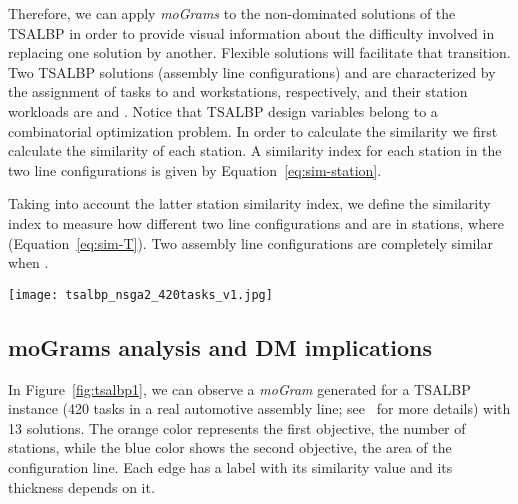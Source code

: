 \documentclass[journal]{IEEEtran}
\begin{document}
Therefore, we can apply \emph{moGrams} to the non-dominated solutions of the TSALBP in order to provide visual information about the difficulty involved in replacing one solution by another. Flexible solutions will facilitate that transition. Two TSALBP solutions (assembly line configurations)  and  are characterized by the assignment of  tasks to  and  workstations, respectively, and their station workloads are  and . Notice that TSALBP design variables belong to a combinatorial optimization problem.
In order to calculate the similarity we first calculate the similarity of each station. A similarity index for each station  in the two line configurations is given by Equation~\ref{eq:sim-station}.



Taking into account the latter station similarity index, we define the similarity index  to measure how different two line configurations  and  are in  stations, where  (Equation~\ref{eq:sim-T}). Two assembly line configurations are completely similar when . 


 
\begin{figure*}[ht]
 \centering
\texttt{[image: tsalbp\_nsga2\_420tasks\_v1.jpg]}
\caption{\emph{moGram} generated for an instance of the TSALBP problem.}
\label{fig:tsalbp1}
\end{figure*}

\subsection{moGrams analysis and DM implications}


In Figure~\ref{fig:tsalbp1}, we can observe a \emph{moGram} generated for a TSALBP instance (420 tasks in a real automotive assembly line; see~\cite{Chica16OMEGA} for more details) with 13 solutions. The orange color represents the first objective, the number of stations, while the blue color shows the second objective, the area of the configuration line. Each edge has a label with its similarity value and its thickness depends on it.
\end{document}
